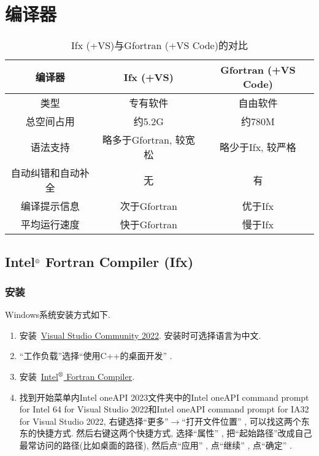 \chapter{编译器}\label{fortran_compiler}
\def\r{${}^\text{\textregistered}$}

\begin{table}[!htbp]
    \centering
    \begin{tabular}{|c|c|c|}
        \hline
        编译器&Ifx (+VS)&Gfortran (+VS Code)\\
        \hline
        类型&专有软件&自由软件\\
        \hline
        总空间占用&约5.2G&约780M\\
        \hline
        语法支持&略多于Gfortran, 较宽松&略少于Ifx, 较严格\\
        \hline
        自动纠错和自动补全&无&有\\
        \hline
        编译提示信息&次于Gfortran&优于Ifx\\
        \hline
        平均运行速度&快于Gfortran&慢于Ifx\\
        \hline
    \end{tabular}
    \caption{Ifx (+VS)与Gfortran (+VS Code)的对比}
\end{table}

\section[Intel\r{} Fortran Compiler]{Intel\r{} Fortran Compiler (Ifx)}

\subsection{安装}

Windows系统安装方式如下.
\begin{enumerate}
    \item 安装~\href{https://visualstudio.microsoft.com/zh-hans/thank-you-downloading-visual-studio/?sku=Community&channel=Release&version=VS2022&source=VSLandingPage&cid=2030&passive=false}
    {Visual Studio Community 2022}. 安装时可选择语言为中文.
    \item ``工作负载''选择``使用C++的桌面开发'' .
    \item 安装~\href{https://registrationcenter-download.intel.com/akdlm/IRC_NAS/1720594b-b12c-4aca-b7fb-a7d317bac5cb/w_fortran-compiler_p_2023.2.1.7.exe}
    {Intel\r{} Fortran Compiler}.
    \item 找到开始菜单内Intel oneAPI 2023文件夹中的Intel oneAPI command prompt for Intel 64 for Visual Studio 2022和Intel oneAPI command prompt for IA32 for Visual Studio 2022, 右键选择``更多''$\rightarrow$``打开文件位置'' , 可以找这两个东东的快捷方式. 然后右键这两个快捷方式, 选择``属性'' , 把``起始路径''改成自己最常访问的路径(比如桌面的路径), 然后点``应用'' , 点``继续'' , 点``确定'' .\label{to_desktop}
\end{enumerate}

